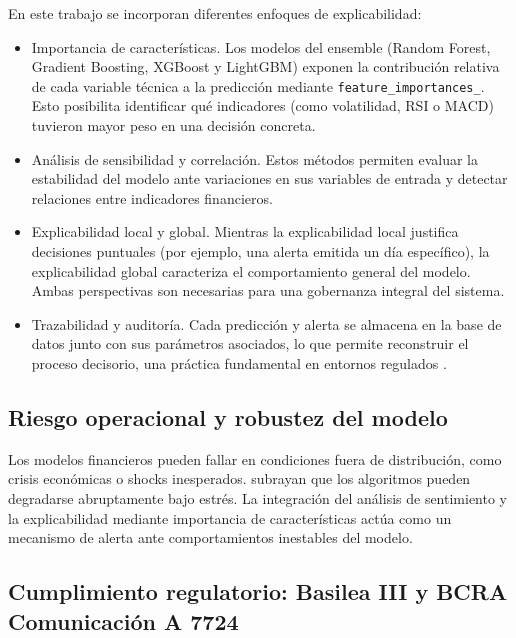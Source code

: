   En este trabajo se incorporan diferentes enfoques de explicabilidad:

  \begin{itemize}
      \item {Importancia de características}. Los modelos del ensemble (Random Forest,        
      Gradient Boosting, XGBoost y LightGBM) exponen la contribución relativa de cada
      variable técnica a la predicción mediante \texttt{feature\_importances\_}. Esto
      posibilita identificar qué indicadores (como volatilidad, RSI o MACD) tuvieron
      mayor peso en una decisión concreta.

      \item {Análisis de sensibilidad y correlación}. Estos métodos permiten evaluar
      la estabilidad del modelo ante variaciones en sus variables de entrada y detectar       
      relaciones entre indicadores financieros.

      \item {Explicabilidad local y global}. Mientras la explicabilidad local justifica       
      decisiones puntuales (por ejemplo, una alerta emitida un día específico), la
      explicabilidad global caracteriza el comportamiento general del modelo. Ambas
      perspectivas son necesarias para una gobernanza integral del sistema.

      \item {Trazabilidad y auditoría}. Cada predicción y alerta se almacena en la
      base de datos junto con sus parámetros asociados, lo que permite reconstruir el
      proceso decisorio, una práctica fundamental en entornos regulados
      \parencite{europeanbanking2022ai}.
  \end{itemize}

 \subsection {Riesgo operacional y robustez del modelo}

  Los modelos financieros pueden fallar en condiciones fuera de distribución, como
  crisis económicas o shocks inesperados. \textcite{danielsson2022artificial} subrayan        
  que los algoritmos pueden degradarse abruptamente bajo estrés. La integración del
  análisis de sentimiento y la explicabilidad mediante importancia de características
  actúa como un mecanismo de alerta ante comportamientos inestables del modelo.


\subsection{Cumplimiento regulatorio: Basilea III y BCRA Comunicación A 7724}

